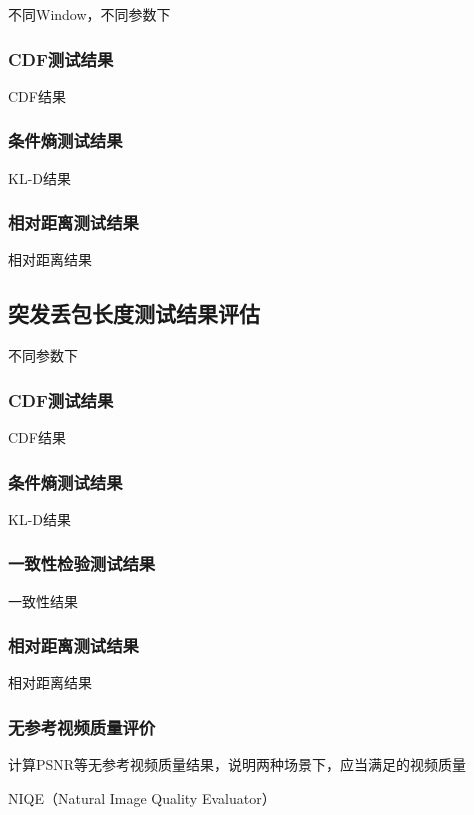 不同Window，不同参数下

\subsubsection{CDF测试结果}
\label{chap:analyze:result:window:cdf}

CDF结果

\subsubsection{条件熵测试结果}
\label{chap:analyze:result:window:kld}

KL-D结果

\subsubsection{相对距离测试结果}
\label{chap:analyze:result:window:distance}

相对距离结果

\subsection{突发丢包长度测试结果评估}
\label{chap:analyze:result:burst}

不同参数下

\subsubsection{CDF测试结果}
\label{chap:analyze:result:burst:cdf}

CDF结果

\subsubsection{条件熵测试结果}
\label{chap:analyze:result:burst:kld}

KL-D结果

\subsubsection{一致性检验测试结果}
\label{chap:analyze:result:burst:statistical}

一致性结果

\subsubsection{相对距离测试结果}
\label{chap:analyze:result:burst:distance}

相对距离结果

\subsubsection{无参考视频质量评价}
\label{chap:analyze:result:burst:vqm}

计算PSNR等无参考视频质量结果，说明两种场景下，应当满足的视频质量

NIQE（Natural Image Quality Evaluator）